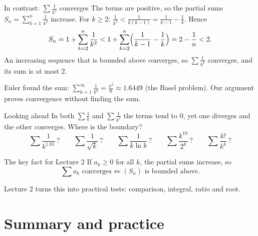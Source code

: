 \documentclass[10pt]{wosm-slides}
\begin{document}
\begin{frame}{In contrast: $\sum \frac{1}{k^2}$ converges}
  The terms are positive, so the partial sums $S_n = \sum_{k=1}^{n} \frac1{k^2}$ increase.
  \pause
  For $k \ge 2$: \quad
  $\displaystyle\frac1{k^2} < \frac{1}{k(k-1)} = \frac1{k-1} - \frac1k$. \quad Hence
  \[ S_n = 1 + \sum_{k=2}^{n} \frac1{k^2}
         < 1 + \sum_{k=2}^{n} \Bigl(\frac1{k-1} - \frac1k\Bigr) = 2 - \frac1n < 2 . \]
  \pause
  An increasing sequence that is bounded above converges, so $\sum \frac1{k^2}$ converges,
  and its sum is at most $2$.
  \begin{remark}
    Euler found the sum: $\sum_{k=1}^\infty \frac1{k^2} = \frac{\pi^2}{6} \approx 1.6449$
    (the Basel problem). Our argument proves convergence without finding the sum.
  \end{remark}
\end{frame}

\begin{frame}{Looking ahead}
  In both $\sum \frac1k$ and $\sum \frac1{k^2}$ the terms tend to $0$,
  yet one diverges and the other converges. Where is the boundary?
  \[ \sum \frac{1}{k^{1.01}}\,? \qquad \sum \frac{1}{\sqrt k}\,? \qquad
     \sum \frac{1}{k \ln k}\,? \qquad \sum \frac{k^{10}}{2^k}\,? \qquad
     \sum \frac{k!}{k^k}\,? \]
  \pause
  \begin{block}{The key fact for Lecture 2}
    If $a_k \ge 0$ for all $k$, the partial sums increase, so
    \[ \sum a_k \text{ converges} \iff (S_n) \text{ is bounded above.} \]
  \end{block}
  Lecture 2 turns this into practical tests: comparison, integral, ratio and root.
\end{frame}

\section{Summary and practice}
\end{document}
